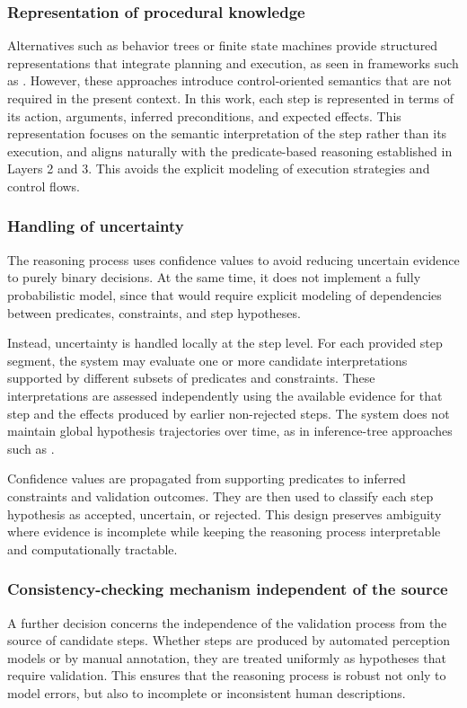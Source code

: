 \subsubsection{Representation of procedural knowledge}
Alternatives such as behavior trees or finite state machines provide structured representations that integrate planning and execution, as seen in frameworks such as \citep{Zhao2025VideoToBT}. However, these approaches introduce control-oriented semantics that are not required in the present context. In this work, each step is represented in terms of its action, arguments, inferred preconditions, and expected effects. This representation focuses on the semantic interpretation of the step rather than its execution, and aligns naturally with the predicate-based reasoning established in Layers 2 and 3. This avoids the explicit modeling of execution strategies and control flows.

\subsubsection{Handling of uncertainty}

The reasoning process uses confidence values to avoid reducing uncertain evidence to purely binary decisions. At the same time, it does not implement a fully probabilistic model, since that would require explicit modeling of dependencies between predicates, constraints, and step hypotheses.

Instead, uncertainty is handled locally at the step level. For each provided step segment, the system may evaluate one or more candidate interpretations supported by different subsets of predicates and constraints. These interpretations are assessed independently using the available evidence for that step and the effects produced by earlier non-rejected steps. The system does not maintain global hypothesis trajectories over time, as in inference-tree approaches such as \citet{WangEtAl2018}.

Confidence values are propagated from supporting predicates to inferred constraints and validation outcomes. They are then used to classify each step hypothesis as accepted, uncertain, or rejected. This design preserves ambiguity where evidence is incomplete while keeping the reasoning process interpretable and computationally tractable.


\subsubsection{Consistency-checking mechanism independent of the source}
A further decision concerns the independence of the validation process from the source of candidate steps. Whether steps are produced by automated perception models or by manual annotation, they are treated uniformly as hypotheses that require validation. This ensures that the reasoning process is robust not only to model errors, but also to incomplete or inconsistent human descriptions.

